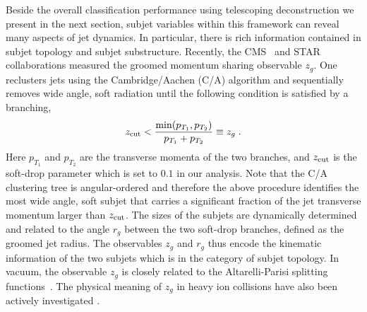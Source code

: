 \documentclass[notoc]{JHEP3}
\begin{document}
Beside the overall classification performance using telescoping deconstruction we present in the next section, subjet variables within this framework can reveal many aspects of jet dynamics. In particular, there is rich information contained in subjet topology and subjet substructure. Recently, the CMS~\cite{Sirunyan:2017bsd} and STAR~\cite{Kauder:2017mhg} collaborations measured the groomed momentum sharing observable $z_g$. One reclusters jets using the Cambridge/Aachen (C/A) algorithm \cite{Dokshitzer:1997in,Wobisch:1998wt} and sequentially removes wide angle, soft radiation until the following condition is satisfied by a branching,
\begin{equation}
    z_{\rm cut} < \frac{\min(p_{T_1},p_{T_2})}{p_{T_1}+p_{T_2}} \equiv z_g\;.
\label{SD}
\end{equation}
Here $p_{T_1}$ and $p_{T_2}$ are the transverse momenta of the two branches, and $z_{\rm cut}$ is the soft-drop parameter which is set to $0.1$ in our analysis. Note that the C/A clustering tree is angular-ordered and therefore the above procedure identifies the most wide angle, soft subjet that carries a significant fraction of the jet transverse momentum larger than $z_{\rm cut}$. The sizes of the subjets are dynamically determined and related to the angle $r_g$ between the two soft-drop branches, defined as the groomed jet radius. The observables $z_g$ and $r_g$ thus encode the kinematic information of the two subjets which is in the category of subjet topology. In vacuum, the observable $z_g$ is closely related to the Altarelli-Parisi splitting functions~\cite{Altarelli:1977zs}. The physical meaning of $z_g$ in heavy ion collisions have also been actively investigated \cite{Chien:2016led,Mehtar-Tani:2016aco,Milhano:2017nzm,Chang:2017gkt,Li:2017wwc}.
\end{document}
